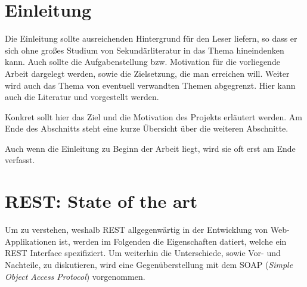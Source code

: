 \documentclass[fleqn,10pt,ngerman]{SelfArx}
\affiliation{\textit{Hochschule Kaiserslautern}} %
\affiliation{\textbf{Corresponding author}: max.mustermann@fh-kl.de} %
\newlength{\tocsep}
\begin{document}
\flushbottom %

\maketitle %

\tableofcontents %

\thispagestyle{empty} %


\section*{Einleitung} %


Die Einleitung sollte ausreichenden Hintergrund für den Leser liefern, so dass er sich ohne großes Studium von Sekundärliteratur
in das Thema hineindenken kann. Auch sollte die Aufgabenstellung bzw. Motivation für die vorliegende Arbeit dargelegt werden, sowie die Zielsetzung, die man erreichen will. Weiter wird auch das Thema von eventuell verwandten Themen abgegrenzt. Hier kann auch die Literatur \cite{Harel:1987,Harel2006} und \cite{Gurp99onthe} vorgestellt werden.

Konkret sollt hier das Ziel und die Motivation des Projekts erläutert werden. Am Ende des Abschnitts steht eine kurze Übersicht über die weiteren Abschnitte.

Auch wenn die Einleitung zu Beginn der Arbeit liegt, wird sie oft erst am Ende verfasst.


\section{REST: State of the art}
Um zu verstehen, weshalb REST allgegenwärtig in der Entwicklung von Web-Applikationen ist, werden im Folgenden die Eigenschaften datiert, welche ein REST Interface spezifiziert. Um weiterhin die Unterschiede, sowie Vor- und Nachteile, zu diskutieren, wird eine Gegenüberstellung mit dem SOAP (\textit{Simple Object Access Protocol}) vorgenommen. 
\end{document}
